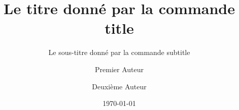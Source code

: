 \documentclass[%
]{article}
\title{Le titre donné par la commande title}
\subtitle{Le sous-titre donné par la commande subtitle}
\author{Premier Auteur \and Deuxième Auteur}
\date{\today}
\begin{document}
\maketitle

\Blinddocument
\end{document}
